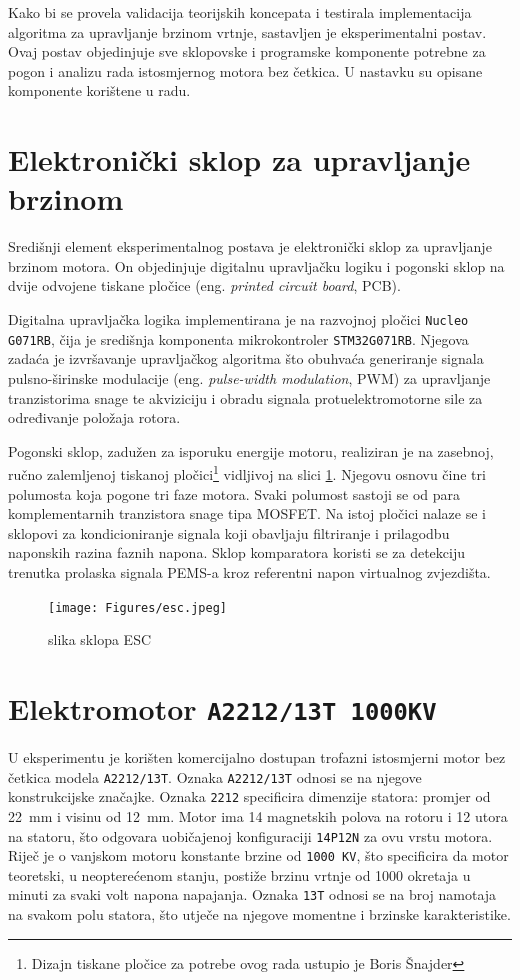 \documentclass[diplomskirad]{fer}
\begin{document}
Kako bi se provela validacija teorijskih koncepata i testirala implementacija
algoritma za upravljanje brzinom vrtnje, sastavljen je eksperimentalni postav.
Ovaj postav objedinjuje sve sklopovske i programske komponente potrebne za
pogon i analizu rada istosmjernog motora bez četkica. U nastavku su opisane
komponente korištene u radu.

\section{Elektronički sklop za upravljanje brzinom}
\label{sec:esc}

Središnji element eksperimentalnog postava je elektronički sklop za upravljanje
brzinom motora. On objedinjuje digitalnu upravljačku logiku i pogonski sklop na
dvije odvojene tiskane pločice (eng. \textit{printed circuit board}, PCB).

Digitalna upravljačka logika implementirana je na razvojnoj pločici
\texttt{Nucleo G071RB}, čija je središnja komponenta mikrokontroler
\texttt{STM32G071RB}. Njegova zadaća je izvršavanje upravljačkog algoritma što
obuhvaća generiranje signala pulsno-širinske modulacije (eng.
\textit{pulse-width modulation}, PWM) za upravljanje tranzistorima snage te
akviziciju i obradu signala protuelektromotorne sile za određivanje položaja
rotora.

Pogonski sklop, zadužen za isporuku energije motoru, realiziran je na zasebnoj,
ručno zalemljenoj tiskanoj pločici\footnote{Dizajn tiskane pločice za potrebe
	ovog rada ustupio je Boris Šnajder} vidljivoj na slici \ref{fig:esc}. Njegovu osnovu čine tri polumosta koja
pogone tri faze motora. Svaki polumost sastoji se od para komplementarnih
tranzistora snage tipa MOSFET. Na istoj pločici nalaze se i sklopovi za
kondicioniranje signala koji obavljaju filtriranje i prilagodbu naponskih
razina faznih napona. Sklop komparatora koristi se za detekciju trenutka
prolaska signala PEMS-a kroz referentni napon virtualnog zvjezdišta.
\begin{figure}[h!]
	\centering
	\texttt{[image: Figures/esc.jpeg]}
	\caption{slika sklopa ESC}
	\label{fig:esc}
\end{figure}

\section{Elektromotor \texttt{A2212/13T 1000KV}}
\label{sec:motor}

U eksperimentu je korišten komercijalno dostupan trofazni istosmjerni motor bez
četkica modela \texttt{A2212/13T}. Oznaka \texttt{A2212/13T} odnosi se na
njegove konstrukcijske značajke. Oznaka \texttt{2212} specificira dimenzije
statora: promjer od \SI{22}{\milli\metre} i visinu od \SI{12}{\milli\metre}.
Motor ima 14 magnetskih polova na rotoru i 12 utora na statoru, što odgovara
uobičajenoj konfiguraciji \texttt{14P12N} za ovu vrstu motora. Riječ je o
vanjskom motoru konstante brzine od \texttt{1000 KV}, što specificira da motor
teoretski, u neopterećenom stanju, postiže brzinu vrtnje od \num{1000} okretaja
u minuti za svaki volt napona napajanja. Oznaka \texttt{13T} odnosi se na broj
namotaja na svakom polu statora, što utječe na njegove momentne i brzinske
karakteristike.
\end{document}
